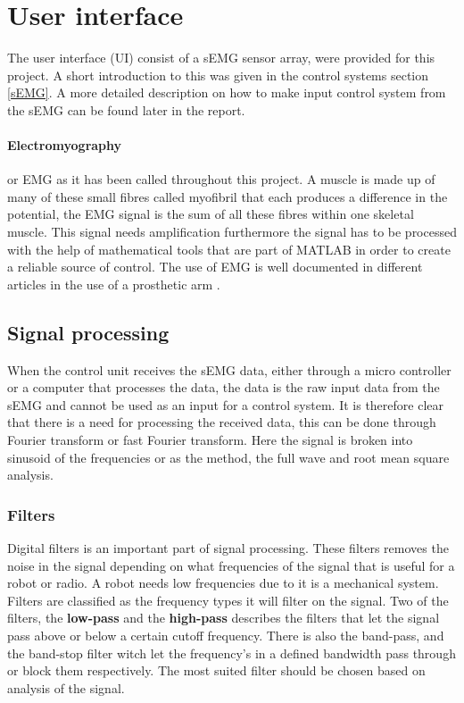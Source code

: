 \section{User interface}\label{st:Emg}
The user interface (UI) consist of a sEMG sensor array, were provided for this project. A short introduction to this was given in the control systems section \ref{sEMG}. A more detailed description on how to make input control system from the sEMG can be found later in the report.

\paragraph{Electromyography} or EMG as it has been called throughout this project. A muscle is made up of many of these small fibres called myofibril that each produces a difference in the potential, the EMG signal is the sum of all these fibres within one skeletal muscle. This signal needs amplification furthermore the signal has to be processed with the help of mathematical tools that are part of MATLAB in order to create a reliable source of control. The use of EMG is well documented in different articles in the use of a prosthetic arm  \cite{Castellini2009}.

\subsection*{Signal processing}
When the control unit receives the sEMG data, either through a micro controller or a computer that processes the data, the data is the raw input data from the sEMG and cannot be used as an input for a control system. It is therefore clear that there is a need for processing the received data, this can be done through Fourier transform or fast Fourier transform. Here the signal is broken into sinusoid  of the frequencies or as the method, the full wave and root mean square analysis.\\ 

\subsubsection{Filters}
Digital filters is an important part of signal processing. 
These filters removes the noise in the signal depending on what frequencies of the signal that is useful for a robot or radio. A robot needs low frequencies due to it is a mechanical system.\\
Filters are classified as the frequency types it will filter on the signal. Two of the filters, the \textbf{low-pass} and the \textbf{high-pass} describes the filters that let the signal pass above or below a certain cutoff frequency. There is also the band-pass, and the band-stop filter witch let the frequency's in a defined bandwidth pass through or block them respectively.
The most suited filter should be chosen based on analysis of the signal.


